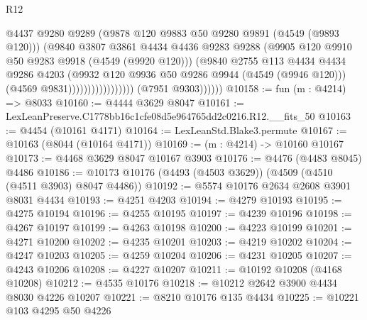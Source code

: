 \begin{lexlean}{R12}
\begin{coremodule}
                                          @4437
                                          @9280
                                          @9289
                                          (@9878 @120 @9883 @50 @9280 @9891 (@4549 (@9893 @120)))
                                          (@9840
                                            @3807
                                            @3861
                                            @4434
                                            @4436
                                            @9283
                                            @9288
                                            (@9905 @120 @9910 @50 @9283 @9918 (@4549 (@9920 @120)))
                                            (@9840
                                              @2755
                                              @113
                                              @4434
                                              @4434
                                              @9286
                                              @4203
                                              (@9932
                                                @120
                                                @9936
                                                @50
                                                @9286
                                                @9944
                                                (@4549 (@9946 @120)))
                                              (@4569 @9831)))))))))))))))))
              (@7951 @9303))))))
@10158 := fun (m : @4214) => @8033
@10160 := @4444 @3629 @8047
@10161 := LexLeanPreserve.C1778bb16c1cfe08d5e964765dd2c0216.R12.__fits_50
@10163 := @4454 (@10161 @4171)
@10164 := LexLeanStd.Blake3.permute
@10167 := @10163 (@8044 (@10164 @4171))
@10169 := (m : @4214) -> @10160 @10167
@10173 := @4468 @3629 @8047 @10167 @3903
@10176 := @4476 (@4483 @8045) @4486
@10186 := @10173 @10176 (@4493 (@4503 @3629)) (@4509 (@4510 (@4511 @3903) @8047 @4486))
@10192 := @5574 @10176 @2634 @2608 @3901 @8031 @4434
@10193 := @4251 @4203
@10194 := @4279 @10193
@10195 := @4275 @10194
@10196 := @4255 @10195
@10197 := @4239 @10196
@10198 := @4267 @10197
@10199 := @4263 @10198
@10200 := @4223 @10199
@10201 := @4271 @10200
@10202 := @4235 @10201
@10203 := @4219 @10202
@10204 := @4247 @10203
@10205 := @4259 @10204
@10206 := @4231 @10205
@10207 := @4243 @10206
@10208 := @4227 @10207
@10211 := @10192 @10208 (@4168 @10208)
@10212 := @4535 @10176
@10218 := @10212 @2642 @3900 @4434 @8030 @4226 @10207
@10221 := @8210 @10176 @135 @4434
@10225 := @10221 @103 @4295 @50 @4226

\end{coremodule}
\end{lexlean}
